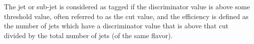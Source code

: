  
The jet or sub-jet is considered as tagged if the discriminator value is above some threshold value, often referred to as the cut value, and the efficiency is defined as the number of jets which have a discriminator value that is above that cut divided by the total number of jets (of the same flavor).
% 

